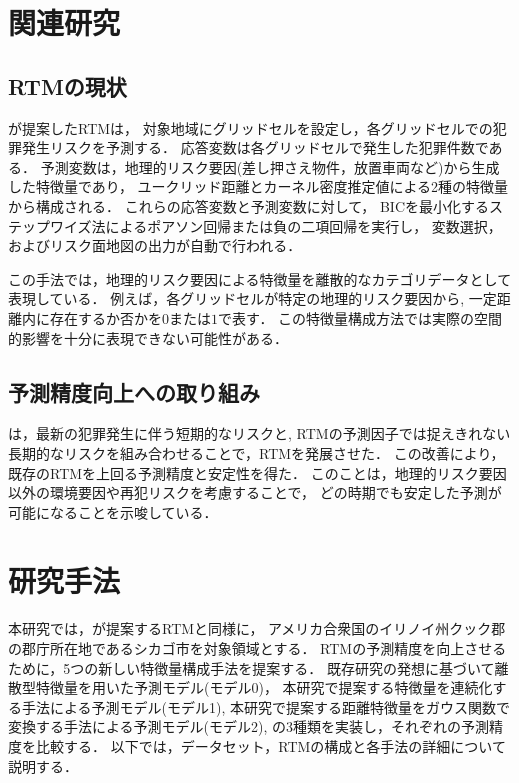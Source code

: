 \documentclass[12pt,a4paper,oneside]{jsbook}
\theoremstyle{plain}
\begin{document}
\chapter{関連研究}
\label{chapter_2}
\section{RTMの現状}
\citet{caplan2015risk}が提案したRTMは，
対象地域にグリッドセルを設定し，各グリッドセルでの犯罪発生リスクを予測する．
応答変数は各グリッドセルで発生した犯罪件数である．
予測変数は，地理的リスク要因(差し押さえ物件，放置車両など)から生成した特徴量であり，
ユークリッド距離とカーネル密度推定値による2種の特徴量から構成される．
これらの応答変数と予測変数に対して，
BICを最小化するステップワイズ法によるポアソン回帰または負の二項回帰を実行し，
変数選択，およびリスク面地図の出力が自動で行われる．

この手法では，地理的リスク要因による特徴量を離散的なカテゴリデータとして表現している．
例えば，各グリッドセルが特定の地理的リスク要因から,
一定距離内に存在するか否かを$0$または$1$で表す．
この特徴量構成方法では実際の空間的影響を十分に表現できない可能性がある．
\section{予測精度向上への取り組み}
\citet{大山智也2020短期的}は，最新の犯罪発生に伴う短期的なリスクと,
RTMの予測因子では捉えきれない長期的なリスクを組み合わせることで，RTMを発展させた．
この改善により，既存のRTMを上回る予測精度と安定性を得た．
このことは，地理的リスク要因以外の環境要因や再犯リスクを考慮することで，
どの時期でも安定した予測が可能になることを示唆している．
\chapter{研究手法}
\label{chapter_3}
本研究では，\citet{caplan2015risk}が提案するRTMと同様に，
アメリカ合衆国のイリノイ州クック郡の郡庁所在地であるシカゴ市を対象領域とする．
RTMの予測精度を向上させるために，5つの新しい特徴量構成手法を提案する．
既存研究の発想に基づいて離散型特徴量を用いた予測モデル(モデル0)，
本研究で提案する特徴量を連続化する手法による予測モデル(モデル1),
本研究で提案する距離特徴量をガウス関数で変換する手法による予測モデル(モデル2),
の3種類を実装し，それぞれの予測精度を比較する．
以下では，データセット，RTMの構成と各手法の詳細について説明する．
\end{document}
